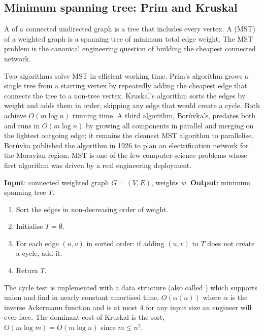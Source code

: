 \subsection{Minimum spanning tree: Prim and Kruskal}

A  of a connected undirected graph is a tree
that includes every vertex. A  (MST)
of a weighted graph is a spanning tree of minimum total edge
weight. The MST problem is the canonical engineering question of
building the cheapest connected network.

Two algorithms solve MST in efficient working time. Prim's
algorithm grows a single tree from a starting vertex by repeatedly
adding the cheapest edge that connects the tree to a non-tree
vertex. Kruskal's algorithm sorts the edges by weight and adds them
in order, skipping any edge that would create a cycle. Both achieve
$O(m \log n)$ running time. A third algorithm, Bor\r{u}vka's,
predates both and runs in $O(m \log n)$ by growing all components
in parallel and merging on the lightest outgoing edge; it remains
the cleanest MST algorithm to parallelise. Bor\r{u}vka published
the algorithm in 1926 \cite{text:v2ch17-boruvka-1926} to plan an
electrification network for the Moravian region; MST is one of the
few computer-science problems whose first algorithm was driven by
a real engineering deployment.

\begin{principle}
\textbf{Input}: connected weighted graph $G = (V, E)$, weights $w$.
\textbf{Output}: minimum spanning tree $T$.

\begin{enumerate}[leftmargin=*]
  \item Sort the edges in non-decreasing order of weight.
  \item Initialise $T = \emptyset$.
  \item For each edge $(u, v)$ in sorted order: if adding $(u, v)$
    to $T$ does not create a cycle, add it.
  \item Return $T$.
\end{enumerate}
\end{principle}

The cycle test is implemented with a  data
structure (also called ) which supports
union and find in nearly constant amortised time, $O(\alpha(n))$
where $\alpha$ is the inverse Ackermann function and is at most $4$
for any input size an engineer will ever face. The dominant cost
of Kruskal is the sort, $O(m \log m) = O(m \log n)$ since $m \leq
n^{2}$.

